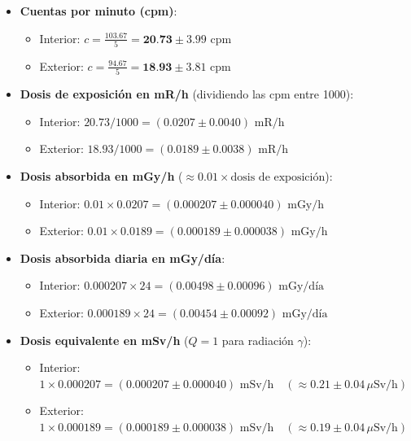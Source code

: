 \documentclass[11pt]{article}
\begin{document}
\begin{itemize}
    \item \textbf{Cuentas por minuto (cpm)}:
    \begin{itemize}
        \item Interior: $c = \frac{103.67}{5} = \textbf{20.73} \pm \mathbf{3.99} \text{ cpm}$
        \item Exterior: $c = \frac{94.67}{5} = \textbf{18.93} \pm \mathbf{3.81} \text{ cpm}$
    \end{itemize}

    \item \textbf{Dosis de exposición en mR/h} (dividiendo las cpm entre 1000):
    \begin{itemize}
        \item Interior: $20.73 / 1000 = (0.0207 \pm 0.0040) \text{ mR/h}$
        \item Exterior: $18.93 / 1000 = (0.0189 \pm 0.0038) \text{ mR/h}$
    \end{itemize}
    
    \item \textbf{Dosis absorbida en mGy/h} ($\approx 0.01 \times \text{dosis de exposición}$):
    \begin{itemize}
        \item Interior: $0.01 \times 0.0207 = (0.000207 \pm 0.000040) \text{ mGy/h}$
        \item Exterior: $0.01 \times 0.0189 = (0.000189 \pm 0.000038) \text{ mGy/h}$
    \end{itemize}
    
    \item \textbf{Dosis absorbida diaria en mGy/día}:
    \begin{itemize}
        \item Interior: $0.000207 \times 24 = (0.00498 \pm 0.00096) \text{ mGy/día}$
        \item Exterior: $0.000189 \times 24 = (0.00454 \pm 0.00092) \text{ mGy/día}$
    \end{itemize}
    
    \item \textbf{Dosis equivalente en mSv/h} ($Q=1$ para radiación $\gamma$):
    \begin{itemize}
        \item Interior: $1 \times 0.000207 = (0.000207 \pm 0.000040) \text{ mSv/h} \quad (\approx 0.21 \pm 0.04 \, \mu\text{Sv/h})$
        \item Exterior: $1 \times 0.000189 = (0.000189 \pm 0.000038) \text{ mSv/h} \quad (\approx 0.19 \pm 0.04 \, \mu\text{Sv/h})$
    \end{itemize}
\end{itemize}
\end{document}
